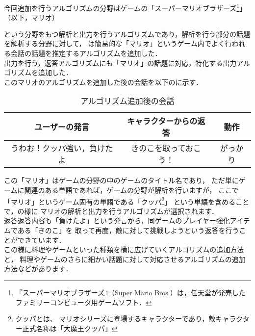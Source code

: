 今回追加を行うアルゴリズムの分野はゲームの「スーパーマリオブラザーズ\footnote{『スーパーマリオブラザーズ』（Super Mario Bros.）は，任天堂が発売したファミリーコンピュータ用ゲームソフト．}」（以下，マリオ）

という分野をもつ解析と出力を行うアルゴリズムであり，解析を行う部分の話題を解析する分野に対して，
は簡易的な「マリオ」というゲーム内でよく行われる会話の話題を推定するアルゴリズムを追加した．\\

出力を行う，返答アルゴリズムにも「マリオ」の話題に対応，特化する出力アルゴリズムを追加した．\\

このマリオのアルゴリズムを追加した後の会話を以下のに示す．\\

\begin{table}[tbh]
	\caption{アルゴリズム追加後の会話} \label{tab:afterChat}
	\begin{center}
		\begin{tabular}[htb]{c|c|c}
		\hline
		ユーザーの発言 & キャラクターからの返答 & 動作 \\
		\hline
		うわお！クッパ強い，負けたよ & きのこを取っておこう！ & がっかり \\
		\hline
		\end{tabular}
	\end{center}
\end{table}

この「マリオ」はゲームの分野の中のゲームのタイトル名であり，
ただ単にゲームに関連のある単語であれば，ゲームの分野が解析を行いますが，
ここで「マリオ」というゲーム固有の単語である「クッパ\footnote{クッパとは、
マリオシリーズに登場するキャラクターであり，敵キャラクター正式名称は「大魔王クッパ」}」
という単語を含めることで，の様に
マリオの解析と出力を行うアルゴリズムが選択されます．
\\
返答返答内容も「負けたよ」という発言から，同ゲームのプレイヤー強化アイテムである「きのこ」を
取って再度，敵に対して挑戦しようという返答を行うことができています．
\\
この様に料理やゲームといった種類を横に広げていくアルゴリズムの追加方法と，
料理やゲームのさらに細かい話題に対して対応させるアルゴリズムの追加方法などがあります．

